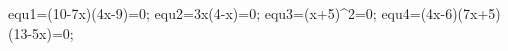 \documentclass[exercice]{thedocument}%
\begin{document}
%
    \>equ1=(10-7x)(4x-9)=0;%
    \>equ2=3x(4-x)=0;%
    \>equ3=(x+5)^2=0;%
    \>equ4=(4x-6)(7x+5)(13-5x)=0;%
\end{document}
